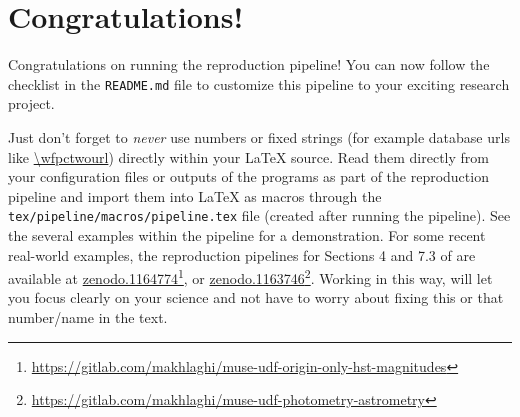 \documentclass[10pt, twocolumn]{article}
\begin{document}

\thispagestyle{firststyle}





\section{Congratulations!}
Congratulations on running the reproduction pipeline! You can now follow
the checklist in the \texttt{README.md} file to customize this pipeline to
your exciting research project.

Just don't forget to \emph{never} use numbers or fixed strings (for example
database urls like \url{\wfpctwourl}) directly within your \LaTeX{}
source. Read them directly from your configuration files or outputs of the
programs as part of the reproduction pipeline and import them into \LaTeX{}
as macros through the \texttt{tex/pipeline/macros/pipeline.tex} file
(created after running the pipeline). See the several examples within the
pipeline for a demonstration. For some recent real-world examples, the
reproduction pipelines for Sections 4 and 7.3 of \citet{bacon17} are
available at
\href{https://doi.org/10.5281/zenodo.1164774}{zenodo.1164774}\footnote{\url{https://gitlab.com/makhlaghi/muse-udf-origin-only-hst-magnitudes}},
or
\href{https://doi.org/10.5281/zenodo.1163746}{zenodo.1163746}\footnote{\url{https://gitlab.com/makhlaghi/muse-udf-photometry-astrometry}}. Working
in this way, will let you focus clearly on your science and not have to
worry about fixing this or that number/name in the text.
\end{document}

